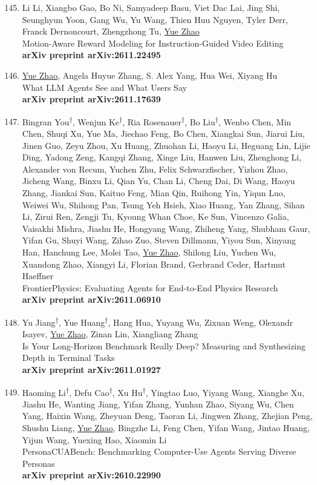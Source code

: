 \documentclass[margin,line,pifont,palatino,courier]{res}
\newcommand{\equalcontrib}{\textsuperscript{$\dagger$}}
\newenvironment{benumerate}[1]{
    \let\oldItem\item
    \def\item{\addtocounter{enumi}{-2}\oldItem}
    \begin{enumerate}[leftmargin=0.25in,label=\textcolor{uscred}{\arabic*.}]
    \setcounter{enumi}{#1}
    \addtocounter{enumi}{1}
}{
    \end{enumerate}
}
\begin{document}
\begin{resume}
\begin{benumerate}{144}
    \item
    Li Li, Xiangbo Gao, Bo Ni, Samyadeep Basu, Viet Dac Lai, Jing Shi, Seunghyun Yoon, Gang Wu, Yu Wang, Thien Huu Nguyen, Tyler Derr, Franck Dernoncourt, Zhengzhong Tu, \underline{Yue Zhao}\\
    Motion-Aware Reward Modeling for Instruction-Guided Video Editing\\
    \textbf{arXiv preprint arXiv:2611.22495}

    \item
    \underline{Yue Zhao}, Angela Huyue Zhang, S. Alex Yang, Hua Wei, Xiyang Hu\\
    What LLM Agents See and What Users Say\\
    \textbf{arXiv preprint arXiv:2611.17639}

    \item
    Bingran You\equalcontrib, Wenjun Ke\equalcontrib, Ria Rosenauer\equalcontrib, Bo Liu\equalcontrib, Wenbo Chen, Min Chen, Shuqi Xu, Yue Ma, Jiechao Feng, Bo Chen, Xiangkai Sun, Jiarui Liu, Jinen Guo, Zeyu Zhou, Xu Huang, Zhuohan Li, Haoyu Li, Heguang Lin, Lijie Ding, Yadong Zeng, Kangqi Zhang, Xinge Liu, Hanwen Liu, Zhenghong Li, Alexander von Recum, Yuchen Zhu, Felix Schwarzfischer, Yizhou Zhao, Jicheng Wang, Binxu Li, Qian Yu, Chan Li, Cheng Dai, Di Wang, Haoyu Zhang, Jiankai Sun, Kaituo Feng, Mian Qin, Ruihong Yin, Yiqun Luo, Weiwei Wu, Shihong Pan, Tsung Yeh Hsieh, Xiao Huang, Yan Zhang, Sihan Li, Zirui Ren, Zengji Tu, Kyoung Whan Choe, Ke Sun, Vincenzo Galia, Vaisakhi Mishra, Jiashu He, Hongyang Wang, Zhiheng Yang, Shubham Gaur, Yifan Gu, Shuyi Wang, Zihao Zuo, Steven Dillmann, Yiyou Sun, Xinyang Han, Hanchung Lee, Molei Tao, \underline{Yue Zhao}, Shilong Liu, Yuchen Wu, Xuandong Zhao, Xiangyi Li, Florian Brand, Gerbrand Ceder, Hartmut Haeffner\\
    FrontierPhysics: Evaluating Agents for End-to-End Physics Research\\
    \textbf{arXiv preprint arXiv:2611.06910}

    \item
    Yu Jiang\equalcontrib, Yue Huang\equalcontrib, Hang Hua, Yuyang Wu, Zixuan Weng, Olexandr Isayev, \underline{Yue Zhao}, Zinan Lin, Xiangliang Zhang\\
    Is Your Long-Horizon Benchmark Really Deep? Measuring and Synthesizing Depth in Terminal Tasks\\
    \textbf{arXiv preprint arXiv:2611.01927}

    \item
    Haoming Li\equalcontrib, Defu Cao\equalcontrib, Xu Hu\equalcontrib, Yingtao Luo, Yiyang Wang, Xianghe Xu, Jiashu He, Wanting Jiang, Yifan Zhang, Yunhan Zhao, Siyang Wu, Chen Yang, Haixin Wang, Zheyuan Deng, Taoran Li, Jingwen Zhang, Zhejian Peng, Shushu Liang, \underline{Yue Zhao}, Bingzhe Li, Feng Chen, Yifan Wang, Jintao Huang, Yijun Wang, Yuexing Hao, Xiaomin Li\\
    PersonaCUABench: Benchmarking Computer-Use Agents Serving Diverse Personas\\
    \textbf{arXiv preprint arXiv:2610.22990}


\end{benumerate}
\end{resume}
\end{document}
